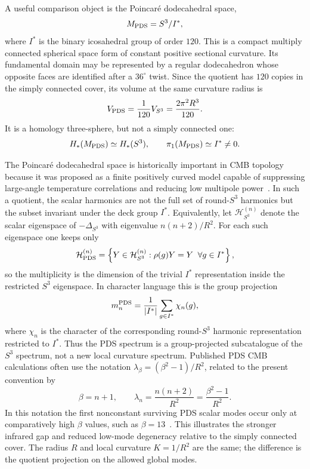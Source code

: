 \documentclass[aps,prd,onecolumn,superscriptaddress,longbibliography,nofootinbib,notitlepage]{revtex4-2}
\begin{document}
A useful comparison object is the Poincar\'e dodecahedral space,
\begin{equation}
  M_{\rm PDS}=S^3/I^\ast ,
\end{equation}
where $I^\ast$ is the binary icosahedral group of order $120$. This is a compact
multiply connected spherical space form of constant positive sectional curvature.
Its fundamental domain may be represented by a regular dodecahedron whose opposite
faces are identified after a $36^\circ$ twist. Since the quotient has $120$
copies in the simply connected cover, its volume at the same curvature radius is
\begin{equation}
  V_{\rm PDS}
  =
  \frac{1}{120}V_{S^3}
  =
  \frac{2\pi^2R^3}{120}.
\end{equation}
It is a homology three-sphere, but not a simply connected one:
\begin{equation}
  H_\ast(M_{\rm PDS})\simeq H_\ast(S^3),
  \qquad
  \pi_1(M_{\rm PDS})\simeq I^\ast\neq 0.
\end{equation}

The Poincar\'e dodecahedral space is historically important in CMB topology
because it was proposed as a finite positively curved model capable of suppressing
large-angle temperature correlations and reducing low multipole power~\cite{Luminet2003,Aurich2005}.
In such a quotient, the scalar harmonics are not the full set of round-$S^3$
harmonics but the subset invariant under the deck group $I^\ast$. Equivalently,
let $\mathcal H^{(n)}_{S^3}$ denote the scalar eigenspace of $-\Delta_{S^3}$
with eigenvalue $n(n+2)/R^2$. For each such eigenspace one keeps only
\begin{equation}
  \mathcal H^{(n)}_{\rm PDS}
  =
  \left\{
  Y\in\mathcal H^{(n)}_{S^3}
  :\rho(g)Y=Y\;\;\forall g\in I^\ast
  \right\},
\end{equation}
so the multiplicity is the dimension of the trivial $I^\ast$ representation
inside the restricted $S^3$ eigenspace. In character language this is the group
projection
\begin{equation}
  m^{\rm PDS}_n
  =
  \frac{1}{|I^\ast|}
  \sum_{g\in I^\ast}\chi_n(g),
\end{equation}
where $\chi_n$ is the character of the corresponding round-$S^3$ harmonic
representation restricted to $I^\ast$. Thus the PDS spectrum is a group-projected
subcatalogue of the $S^3$ spectrum, not a new local curvature spectrum.
Published PDS CMB calculations often use the notation
$\lambda_\beta=(\beta^2-1)/R^2$, related to the present convention by
\begin{equation}
  \beta=n+1,
  \qquad
  \lambda_n=\frac{n(n+2)}{R^2}=\frac{\beta^2-1}{R^2}.
\end{equation}
In this notation the first nonconstant surviving PDS scalar modes occur only at
comparatively high $\beta$ values, such as $\beta=13$~\cite{Aurich2005}. This
illustrates the stronger infrared gap and reduced low-mode degeneracy relative to
the simply connected cover. The radius $R$ and local curvature $K=1/R^2$ are the
same; the difference is the quotient projection on the allowed global modes.
\end{document}
